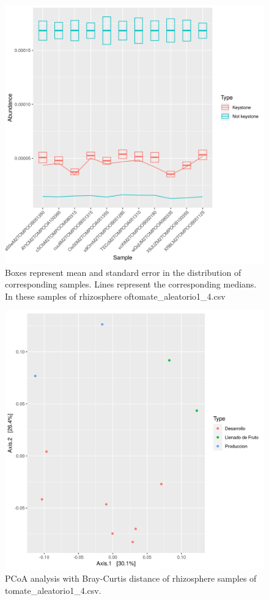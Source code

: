 \begin{figure}
 \centering
 \includegraphics[scale = 0.75]{mean_median_key_vs_not_key_tomate_aleatorio1_4.csv.png}
\caption{Boxes represent mean and standard error in the distribution of corresponding samples. Lines represent the corresponding medians. In these samples of rhizosphere oftomate_aleatorio1_4.csv}
\label{mean_median_tomate_aleatorio1_4.csv}
\end{figure}
\begin{figure}
   \centering
   \includegraphics[scale = 0.7]{pcoa_muestras_tomate_aleatorio1_4.csv.png}
 \caption{PCoA analysis with Bray-Curtis distance of rhizosphere samples of tomate_aleatorio1_4.csv.}
 \label{fig:tomate_aleatorio1_4.csv_pcoa}
\end{figure}
